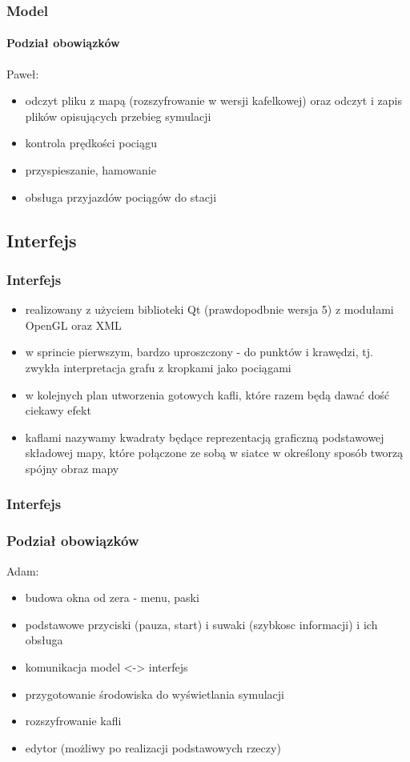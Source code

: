 \documentclass[a4paper, 11pt]{beamer}
\begin{document}
\begin{frame}
\frametitle{Model}
\framesubtitle{Podział obowiązków}
Paweł:
\begin{itemize}
\item odczyt pliku z mapą (rozszyfrowanie w wersji kafelkowej) oraz odczyt i zapis plików opisujących przebieg symulacji 
\item kontrola prędkości pociągu 
\item przyspieszanie, hamowanie
\item obsługa przyjazdów pociągów do stacji
\end{itemize}
\end{frame}
\subsection{Interfejs}
\begin{frame}
\frametitle{Interfejs}
\begin{itemize}
\item realizowany z użyciem biblioteki Qt (prawdopodbnie wersja 5) z modułami OpenGL oraz XML
\item w sprincie pierwszym, bardzo uproszczony - do punktów i krawędzi, tj. zwykła interpretacja grafu z kropkami jako pociągami
\item w kolejnych plan utworzenia gotowych kafli, które razem będą dawać dość ciekawy efekt
\item kaflami nazywamy kwadraty będące reprezentacją graficzną podstawowej składowej mapy, które połączone ze sobą w siatce w określony sposób tworzą spójny obraz mapy
\end{itemize}
\end{frame}
\begin{frame}
\frametitle{Interfejs}
\frametitle{Podział obowiązków}
Adam:
\begin{itemize}
\item budowa okna od zera - menu, paski
\item podstawowe przyciski (pauza, start) i suwaki (szybkosc informacji) i ich obsługa
\item komunikacja model <-> interfejs
\item przygotowanie środowiska do wyświetlania symulacji
\item rozszyfrowanie kafli
\item edytor (możliwy po realizacji podstawowych rzeczy)
\end{itemize}
\end{frame}
\end{document}
